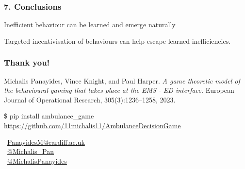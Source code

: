 \begin{frame}
    \frametitle{7. Conclusions}
    \centering
    \Large

    Inefficient behaviour can be learned and emerge naturally

    \vspace{1cm}

    Targeted incentivisation of behaviours can help escape learned inefficiencies.

\end{frame}

\begin{frame}
    \frametitle{\Large{Thank you!}}
    \centering
    
    \footnotesize
    Michalis Panayides, Vince Knight, and Paul Harper. \textit{A game theoretic model of the behavioural gaming that takes place at the EMS - ED interface.} European Journal of Operational Research, 305(3):1236–1258, 2023.

    \vspace{1cm}
    \small{\$ pip install ambulance\_game}
    \small{\url{https://github.com/11michalis11/AmbulanceDecisionGame}}

    \vspace{1cm}
    \faEnvelope \, \url{PanayidesM@cardiff.ac.uk} \\
    \faTwitterSquare \, \url{@Michalis_Pan} \\
    \faGithubSquare \, \url{@MichalisPanayides} \\

\end{frame}


